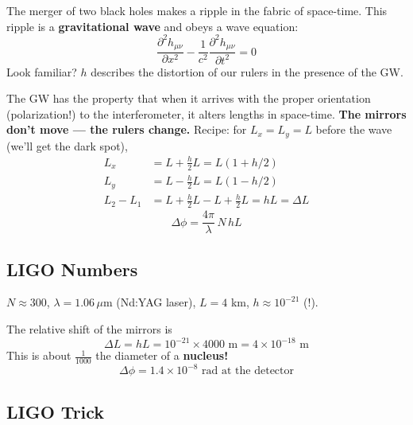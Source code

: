\documentclass[11pt]{report}
\begin{document}
The merger of two black holes makes a ripple in the fabric of space-time. This ripple is a \textbf{gravitational wave} and obeys a wave equation:
\begin{equation}
\frac{\partial^2 h_{\mu\nu}}{\partial x^2} - \frac{1}{c^2}\frac{\partial^2 h_{\mu\nu}}{\partial t^2} = 0
\end{equation}
Look familiar? $h$ describes the distortion of our rulers in the presence of the GW.

The GW has the property that when it arrives with the proper orientation (polarization!) to the interferometer, it alters lengths in space-time. \textbf{The mirrors don't move --- the rulers change.} Recipe: for $L_x = L_y = L$ before the wave (we'll get the dark spot),
\begin{align}
L_x &= L + \tfrac{h}{2}L = L(1 + h/2) \\
L_y &= L - \tfrac{h}{2}L = L(1 - h/2) \\
L_2 - L_1 &= L + \tfrac{h}{2}L - L + \tfrac{h}{2}L = hL = \Delta L
\end{align}
\begin{equation}
\Delta\phi = \frac{4\pi}{\lambda}\,N\,h L
\end{equation}

\subsection*{LIGO Numbers}

$N \approx 300$, $\lambda = 1.06\,\mu$m (Nd:YAG laser), $L = 4$ km, $h \approx 10^{-21}$ (!).

The relative shift of the mirrors is
\begin{equation}
\Delta L = h L = 10^{-21} \times 4000\text{ m} = 4 \times 10^{-18}\text{ m}
\end{equation}
This is about $\tfrac{1}{1000}$ the diameter of a \textbf{nucleus!}
\begin{equation}
\Delta\phi = 1.4\times 10^{-8}\text{ rad at the detector}
\end{equation}

\subsection*{LIGO Trick}
\end{document}
